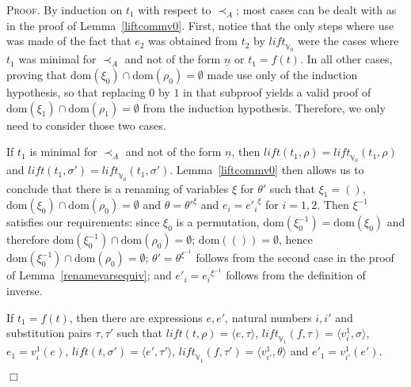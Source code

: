 \documentclass{article}
\newenvironment{proof}{\smallskip\textsc{Proof.}}{\hspace*{\fill}$\Box$}
\newcommand{\V}{{\mathbb V}}
\newcommand{\less}{\mathrel{\prec_A}}
\newcommand{\liftv}[1]{\ensuremath{\mathit{lift}_{\V_{#1}}}}
\newcommand{\lift}{\ensuremath{\mathit{lift}}}
\newcommand{\dom}{\ensuremath{\mathrm{dom}}}
\newcommand{\renamevar}[2]{\ensuremath{{#1}^{#2}}}
\newcommand{\isrenamevar}[3]{\ensuremath{{#1}=\renamevar{#2}{#3}}}
\newcommand{\idn}{()}
\begin{document}
\begin{proof}
By induction on $t_1$ with respect to $\less$; most cases can be dealt
with as in the proof of Lemma~\ref{liftcommv0}.  First, notice that the
only steps where use was made of the fact
that $e_2$ was obtained from $t_2$ by $\liftv0$ were the cases where $t_1$
was minimal for $\less$ and not of the form $\underline n$ or $t_1=f(t)$.
In all other cases, proving that $\dom(\xi_0)\cap\dom(\rho_0)=\emptyset$
made use only of the induction hypothesis, so that replacing $0$ by $1$
in that subproof yields a valid proof of
$\dom(\xi_1)\cap\dom(\rho_1)=\emptyset$ from the induction hypothesis.
Therefore, we only need to consider those two cases.

If $t_1$ is minimal for $\less$ and not of the form $\underline n$,
then $\lift(t_1,\rho)=\liftv0(t_1,\rho)$ and
$\lift(t_1,\sigma')=\liftv0(t_1,\sigma')$.  Lemma~\ref{liftcommv0}
then allows us to conclude that there is a renaming of variables $\xi$
for $\theta'$ such that $\xi_1=\idn$,
$\dom(\xi_0)\cap\dom(\rho_0)=\emptyset$ and
{\isrenamevar\theta{\theta'}\xi} and {\isrenamevar{e_i}{e'_i}\xi} for $i=1,2$.
Then $\xi^{-1}$ satisfies our requirements: since $\xi_0$ is a permutation,
$\dom(\xi^{-1}_0)=\dom(\xi_0)$ and therefore
$\dom(\xi^{-1}_0)\cap\dom(\rho_0)=\emptyset$; $\dom(\idn)=\emptyset$, hence
$\dom(\xi^{-1}_0)\cap\dom(\rho_0)=\emptyset$;
{\isrenamevar{\theta'}\theta{\xi^{-1}}} follows from the second case in the
proof of Lemma~\ref{renamevarsequiv}; and {\isrenamevar{e'_i}{e_i}{\xi^{-1}}}
follows from the definition of inverse.

If $t_1=f(t)$, then there are expressions $e,e'$, natural numbers $i,i'$
and substitution pairs $\tau,\tau'$ such that
$\lift(t,\rho)=\langle e,\tau\rangle$,
$\liftv1(f,\tau)=\langle v^1_i,\sigma\rangle$, $e_1=v^1_i(e)$,
$\lift(t,\sigma')=\langle e',\tau'\rangle$,
$\liftv1(f,\tau')=\langle v^1_{i'},\theta\rangle$ and $e'_1=v^1_{i'}(e')$.


\end{proof}
\end{document}
